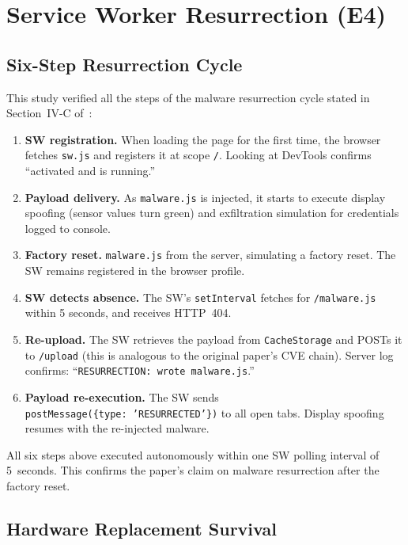\documentclass[conference]{IEEEtran}
\begin{document}
\section{Service Worker Resurrection (E4)}
\label{sec:e4}

\subsection{Six-Step Resurrection Cycle}

This study verified all the steps of the malware resurrection cycle stated in Section~IV-C of~\cite{ironspider2024}:

\begin{enumerate}
  \item \textbf{SW registration.} When loading the page for the first time, the browser fetches \texttt{sw.js} and registers it at scope \texttt{/}. Looking at DevTools confirms ``activated and is running.''
  \item \textbf{Payload delivery.} As \texttt{malware.js} is injected, it starts to execute display spoofing (sensor values turn green) and exfiltration simulation for credentials logged to console.
  \item \textbf{Factory reset.} \texttt{malware.js} from the server, simulating a factory reset. The SW remains registered in the browser profile.
  \item \textbf{SW detects absence.} The SW's \texttt{setInterval} fetches for \texttt{/malware.js} within 5 seconds, and receives HTTP~404.
  \item \textbf{Re-upload.} The SW retrieves the payload from \texttt{CacheStorage} and POSTs it to \texttt{/upload} (this is analogous to the original paper's CVE chain). Server log confirms: ``\texttt{RESURRECTION: wrote malware.js}.''
  \item \textbf{Payload re-execution.} The SW sends \texttt{postMessage(\{type:~'RESURRECTED'\})} to all open tabs. Display spoofing resumes with the re-injected malware.
\end{enumerate}

All six steps above executed autonomously within one SW polling interval of 5~seconds. This confirms the paper's claim on malware resurrection after the factory reset.

\subsection{Hardware Replacement Survival}
\end{document}
